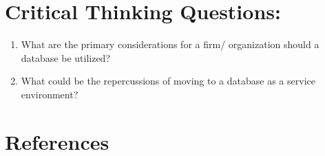 \documentclass[
  letterpaper,
  DIV=11,
  numbers=noendperiod]{scrreprt}
\providecommand{\tightlist}{%
  \setlength{\itemsep}{0pt}\setlength{\parskip}{0pt}}\usepackage{longtable,booktabs,array}
\begin{document}
\section{Critical Thinking
Questions:}\label{critical-thinking-questions-6}

\begin{enumerate}
\def\labelenumi{\arabic{enumi}.}
\tightlist
\item
  What are the primary considerations for a firm/ organization should a
  database be utilized?
\item
  What could be the repercussions of moving to a database as a service
  environment?
\end{enumerate}

\section{References}\label{references-3}
\end{document}
